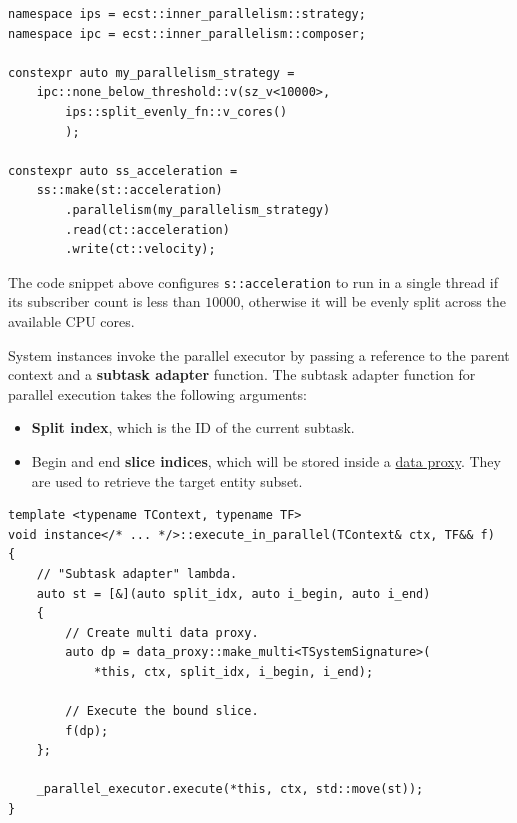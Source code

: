 \documentclass[oneside, 12pt, a4paper, openany]{book}
\begin{document}
\begin{verbatim}
namespace ips = ecst::inner_parallelism::strategy;
namespace ipc = ecst::inner_parallelism::composer;

constexpr auto my_parallelism_strategy =
    ipc::none_below_threshold::v(sz_v<10000>,
        ips::split_evenly_fn::v_cores()
        );

constexpr auto ss_acceleration =
    ss::make(st::acceleration)
        .parallelism(my_parallelism_strategy)
        .read(ct::acceleration)
        .write(ct::velocity);
\end{verbatim}

The code snippet above configures
\texttt{s::acceleration}
to run in a single thread if its subscriber count is less than
\(10000\), otherwise it will be evenly split across the available CPU
cores.

System instances invoke the parallel executor by passing a reference to
the parent context and a \textbf{subtask adapter} function. The subtask
adapter function for parallel execution takes the following arguments:

\begin{itemize}
\item
  \textbf{Split index}, which is the ID of the current subtask.
\item
  Begin and end \textbf{slice indices}, which will be stored inside a
  \protect\hyperlink{dddata_proxy}{data proxy}. They are used to
  retrieve the target entity subset.
\end{itemize}

\begin{verbatim}
template <typename TContext, typename TF>
void instance</* ... */>::execute_in_parallel(TContext& ctx, TF&& f)
{
    // "Subtask adapter" lambda.
    auto st = [&](auto split_idx, auto i_begin, auto i_end)
    {
        // Create multi data proxy.
        auto dp = data_proxy::make_multi<TSystemSignature>(
            *this, ctx, split_idx, i_begin, i_end);

        // Execute the bound slice.
        f(dp);
    };

    _parallel_executor.execute(*this, ctx, std::move(st));
}
\end{verbatim}
\end{document}
